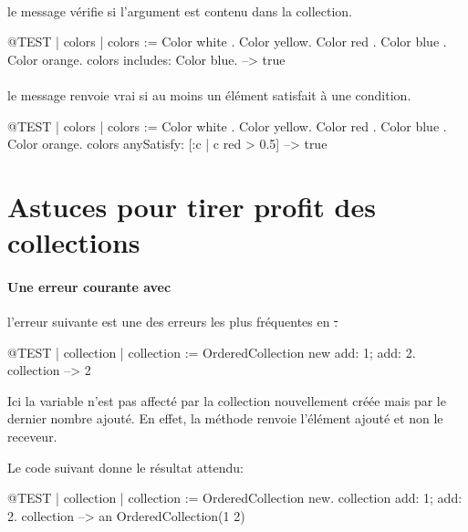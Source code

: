 \documentclass[a4paper,10pt,twoside]{book}
\begin{document}
\paragraph{} le message  v\'erifie si l'argument est contenu dans la collection.

\begin{code}{@TEST | colors |}
colors := {Color white . Color yellow. Color red . Color blue . Color orange}.
colors includes: Color blue. --> true
\end{code}

\paragraph{} le message  renvoie vrai si au moins un \'el\'ement satisfait \`a une condition. 

\begin{code}{@TEST | colors | colors := {Color white . Color yellow. Color red . Color blue . Color orange}.}
colors anySatisfy: [:c | c red > 0.5] --> true
\end{code}
\section{Astuces pour tirer profit des collections}

\paragraph{Une erreur courante avec } l'erreur
suivante est une des erreurs les plus fr\'equentes en \st.

\begin{code}{@TEST | collection | }
collection := OrderedCollection new add: 1; add: 2.
collection --> 2
\end{code}
\noindent
Ici la variable  n'est pas affect\'e par la collection nouvellement cr\'e\'ee mais par le dernier nombre ajout\'e.
En effet, la m\'ethode  renvoie l'\'el\'ement ajout\'e et non le receveur.

Le code suivant donne le r\'esultat attendu:
\begin{code}{@TEST | collection |}
collection := OrderedCollection new.
collection add: 1; add: 2.
collection --> an OrderedCollection(1 2)
\end{code}
\end{document}
